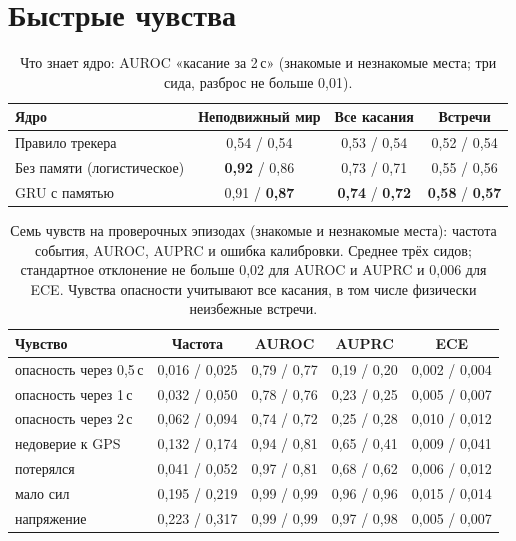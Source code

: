 \documentclass[10pt]{article}
\begin{document}
\section{Быстрые чувства}\label{sec:fast}
\begin{table}[t]
\centering\small
\caption{Что знает ядро: AUROC «касание за 2\,с» (знакомые и незнакомые места; три сида, разброс не больше 0,01).}
\label{tab:auroc}
\begin{tabular}{@{}lccc@{}}
\toprule
Ядро & Неподвижный мир & Все касания & Встречи \\
\midrule
Правило трекера & 0,54 / 0,54 & 0,53 / 0,54 & 0,52 / 0,54 \\
Без памяти (логистическое) & \textbf{0,92} / 0,86 & 0,73 / 0,71 & 0,55 / 0,56 \\
GRU с памятью & 0,91 / \textbf{0,87} & \textbf{0,74} / \textbf{0,72} & \textbf{0,58} / \textbf{0,57} \\
\bottomrule
\end{tabular}
\end{table}

\begin{table}[t]
\centering\small
\caption{Семь чувств на проверочных эпизодах (знакомые и незнакомые места): частота события, AUROC, AUPRC и ошибка калибровки. Среднее трёх сидов; стандартное отклонение не больше 0,02 для AUROC и AUPRC и 0,006 для ECE. Чувства опасности учитывают все касания, в том числе физически неизбежные встречи.}
\label{tab:feelings}
\setlength{\tabcolsep}{4pt}
\begin{tabular}{@{}lcccc@{}}
\toprule
Чувство & Частота & AUROC & AUPRC & ECE \\
\midrule
опасность через 0,5\,с & 0,016 / 0,025 & 0,79 / 0,77 & 0,19 / 0,20 & 0,002 / 0,004 \\
опасность через 1\,с & 0,032 / 0,050 & 0,78 / 0,76 & 0,23 / 0,25 & 0,005 / 0,007 \\
опасность через 2\,с & 0,062 / 0,094 & 0,74 / 0,72 & 0,25 / 0,28 & 0,010 / 0,012 \\
недоверие к GPS & 0,132 / 0,174 & 0,94 / 0,81 & 0,65 / 0,41 & 0,009 / 0,041 \\
потерялся & 0,041 / 0,052 & 0,97 / 0,81 & 0,68 / 0,62 & 0,006 / 0,012 \\
мало сил & 0,195 / 0,219 & 0,99 / 0,99 & 0,96 / 0,96 & 0,015 / 0,014 \\
напряжение & 0,223 / 0,317 & 0,99 / 0,99 & 0,97 / 0,98 & 0,005 / 0,007 \\
\bottomrule
\end{tabular}
\end{table}
\end{document}
